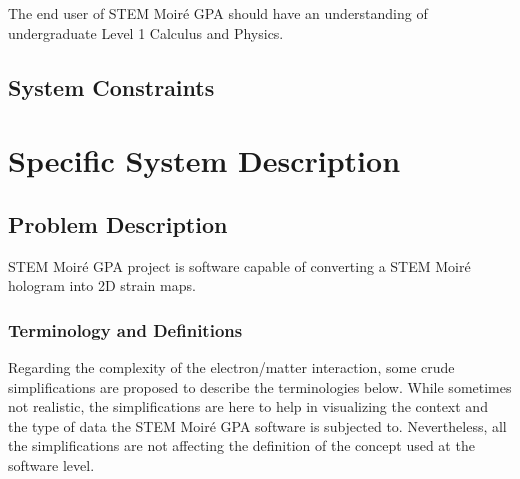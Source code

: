 \documentclass[12pt]{article}
\newcommand{\progname}{STEM Moir{\'e} GPA}
\begin{document}
The end user of \progname{} should have an understanding of undergraduate Level
1 Calculus and Physics.

\subsection{System Constraints}


\section{Specific System Description}
\subsection{Problem Description} \label{Sec_pd}

STEM Moir{\'e} GPA project is software capable of converting a STEM Moir{\'e} 
hologram into 2D strain maps.

\subsubsection{Terminology and Definitions}

Regarding the complexity of the electron/matter interaction, some crude 
simplifications are proposed to describe the terminologies below. While 
sometimes not realistic, the simplifications are here to help in visualizing the 
context and the type of data the STEM Moir{\'e} GPA software is subjected to. Nevertheless, 
all the simplifications are not affecting the definition of the concept used at 
the software level.
\end{document}
